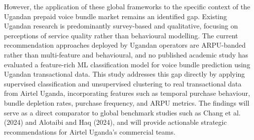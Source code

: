 However, the application of these global frameworks to the specific context of the Ugandan prepaid voice bundle market remains an identified gap. Existing Ugandan research is predominantly survey-based and qualitative, focusing on perceptions of service quality rather than behavioural modelling. The current recommendation approaches deployed by Ugandan operators are ARPU-banded rather than multi-feature and behavioural, and no published academic study has evaluated a feature-rich ML classification model for voice bundle prediction using Ugandan transactional data. This study addresses this gap directly by applying supervised classification and unsupervised clustering to real transactional data from Airtel Uganda, incorporating features such as temporal purchase behaviour, bundle depletion rates, purchase frequency, and ARPU metrics. The findings will serve as a direct comparator to global benchmark studies such as Chang et al. (2024) and Alotaibi and Haq (2024), and will provide actionable strategic recommendations for Airtel Uganda's commercial teams.
